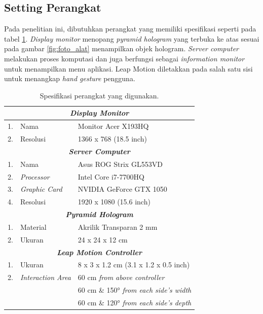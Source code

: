 \documentclass[conference]{IEEEtran}
\begin{document}
	\subsection{Setting Perangkat}
		Pada penelitian ini, dibutuhkan perangkat yang memiliki spesifikasi seperti pada tabel \ref{fig:spesifikasi_alat}. \textit{Display monitor} menopang \textit{pyramid hologram} yang terbuka ke atas sesuai pada gambar \ref{fig:foto_alat} menampilkan objek hologram. \textit{Server computer} melakukan proses komputasi dan juga berfungsi sebagai \textit{information monitor} untuk menampilkan menu aplikasi. Leap Motion diletakkan pada salah satu sisi untuk menangkap \textit{hand gesture} pengguna.
		\vspace{-2ex}
		\begin{table}[h]
			\caption{Spesifikasi perangkat yang digunakan.}
			\label{fig:spesifikasi_alat}
			\vspace{-2ex}
			\begin{center}
				\begin{tabular}{|l|l|l|}
					\hline
					\multicolumn{3}{|c|}{\textit{\textbf{Display Monitor}}}                                                       \\ \hline
					1. & Nama                  & Monitor Acer X193HQ                   \\ \hline
					2. & Resolusi              & 1366 x 768 (18.5 inch)                \\ \hline
					\multicolumn{3}{|c|}{\textit{\textbf{Server Computer}}}\\ \hline
					1. & Nama                  & Asus ROG Strix GL553VD                \\ \hline
					2. & \textit{Processor}    & Intel Core i7-7700HQ                  \\ \hline
					3. & \textit{Graphic Card} & NVIDIA GeForce GTX 1050               \\ \hline
					4. & Resolusi              & 1920 x 1080 (15.6 inch)               \\ \hline
					\multicolumn{3}{|c|}{\textit{\textbf{Pyramid Hologram}}} \\ \hline
					1. & Material              & Akrilik Transparan 2 mm                    \\ \hline
					2. & Ukuran                & 24 x 24 x 12 cm                        \\ \hline
					\multicolumn{3}{|c|}{\textit{\textbf{Leap Motion Controller}}}\\ \hline
					1. & Ukuran                & 8 x 3 x 1.2 cm (3.1 x 1.2 x 0.5 inch) \\ \hline
					2. & \textit{Interaction Area}& 60 cm \textit{from above controller } \\ \cline{3-3} 
					&                       & 60 cm \& 150° \textit{from each side's width}  \\ \cline{3-3} 
					&                       & 60 cm \& 120° \textit{from each side's depth}  \\ \hline
				\end{tabular}
			\end{center}
		\end{table}
\end{document}
